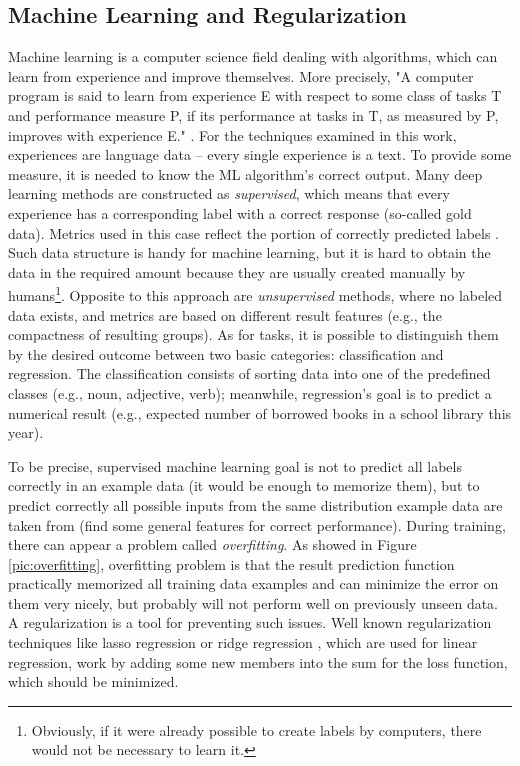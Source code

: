 \subsection{Machine Learning and Regularization}
\label{sub:ml}
Machine learning is a computer science field dealing with algorithms, which can learn from experience and improve themselves. More precisely, "A computer program is said to learn from experience E with respect to some class of tasks T and performance measure P, if its performance at tasks in T, as measured by P, improves with experience E." \citep{Mitchell1997}. For the techniques examined in this work, experiences are language data -- every single experience is a text. To provide some measure, it is needed to know the ML algorithm's correct output. Many deep learning methods are constructed as \textit{supervised}, which means that every experience has a corresponding label with a correct response (so-called gold data). Metrics used in this case reflect the portion of correctly predicted labels \citep{Russell1995}. Such data structure is handy for machine learning, but it is hard to obtain the data in the required amount because they are usually created manually by humans\footnote{Obviously, if it were already possible to create labels by computers, there would not be necessary to learn it.}. Opposite to this approach are \textit{unsupervised} methods, where no labeled data exists, and metrics are based on different result features (e.g., the compactness of resulting groups). As for tasks, it is possible to distinguish them by the desired outcome between two basic categories: classification and regression. The classification consists of sorting data into one of the predefined classes (e.g., noun, adjective, verb); meanwhile, regression's goal is to predict a numerical result (e.g., expected number of borrowed books in a school library this year).
\par
To be precise, supervised machine learning goal is not to predict all labels correctly in an example data (it would be enough to memorize them), but to predict correctly all possible inputs from the same distribution example data are taken from (find some general features for correct performance). During training, there can appear a problem called \textit{overfitting}. As showed in Figure \ref{pic:overfitting}, overfitting problem is that the result prediction function practically memorized all training data examples and can minimize the error on them very nicely, but probably will not perform well on previously unseen data. A regularization is a tool for preventing such issues. Well known regularization techniques like lasso regression \citep{Tibshirani1996} or ridge regression \citep{Hoerl1970}, which are used for linear regression, work by adding some new members into the sum for the loss function, which should be minimized.
